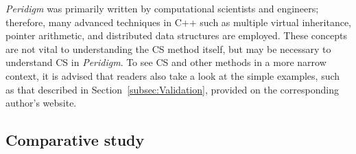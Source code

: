 \documentclass[preprint,12pt]{elsarticle}
\begin{document}
\emph{Peridigm} was primarily written by computational scientists and engineers; therefore, many advanced techniques in C++ such as multiple virtual inheritance, pointer arithmetic, and distributed data structures are employed. These concepts are not vital to understanding the CS method itself, but may be necessary to understand CS in \emph{Peridigm}. To see CS and other methods in a more narrow context, it is advised that readers also take a look at the simple examples, such as that described in Section~\ref{subsec:Validation},  provided on the corresponding author's website.

\subsection{Comparative study} 
\label{tcs}
\end{document}
